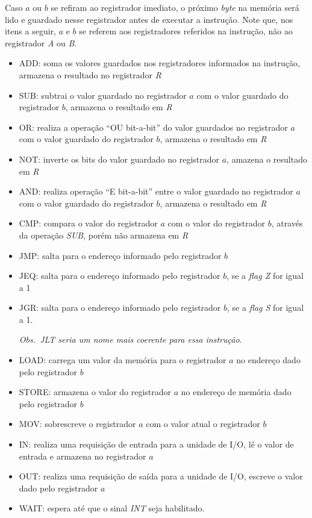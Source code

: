 \documentclass[a4paper,12pt]{report}
\begin{document}
Caso $a$ ou $b$ se refiram ao registrador imediato, o próximo \textit{byte} na 
memória será lido e guardado nesse registrador antes de executar a instrução. Note que,
nos itens a seguir, $a$ e $b$ se referem aos registradores referidos na instrução, 
não ao registrador \textit{A} ou \textit{B}.

\begin{itemize}
	\item ADD: soma os valores guardados nos registradores informados na instrução, armazena o resultado no registrador \textit{R}
	\item SUB: subtrai o valor guardado no registrador $a$ com o valor guardado do registrador $b$, armazena o resultado em \textit{R}
	\item OR: realiza a operação ``OU bit-a-bit'' do valor guardados no registrador $a$ com o valor guardado do registrador $b$, armazena o resultado em \textit{R}
	\item NOT: inverte os bits do valor guardado no registrador $a$, amazena o resultado em \textit{R}
	\item AND: realiza operação ``E bit-a-bit'' entre o valor guardado no registrador $a$ com o valor guardado do registrador $b$, armazena o resultado em \textit{R}
	\item CMP: compara o valor do registrador $a$ com o valor do registrador $b$, através da operação \textit{SUB}, porém não armazena em \textit{R}
	\item JMP: salta para o endereço informado pelo registrador $b$
	\item JEQ: salta para o endereço informado pelo registrador $b$, se a \textit{flag Z} for igual a 1 
	\item JGR: salta para o endereço informado pelo registrador $b$, se a \textit{flag S} for igual a 1.

	\textit{Obs.\ JLT seria um nome mais coerente para essa instrução.}

	\item LOAD: carrega um valor da memória para o registrador $a$ no endereço dado pelo registrador $b$
	\item STORE: armazena o valor do registrador $a$ no endereço de memória dado pelo registrador $b$
	\item MOV: sobrescreve o registrador $a$ com o valor atual o registrador $b$
	\item IN: realiza uma requisição de entrada para a unidade de I/O, lê o valor de entrada e armazena no registrador $a$
	\item OUT: realiza uma requisição de saída para a unidade de I/O, escreve o valor dado pelo registrador $a$
	\item WAIT: espera até que o sinal \textit{INT} seja habilitado.


\end{itemize}
\end{document}
